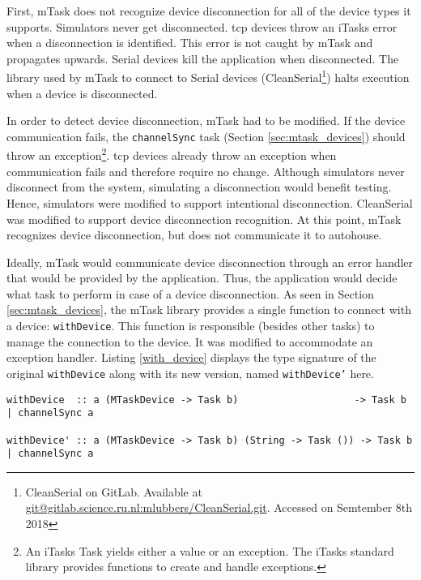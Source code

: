 First, \gls{mTask} does not recognize device disconnection for all of the device types it supports. Simulators never get disconnected. \acs{tcp} devices throw an \gls{iTasks} error when a disconnection is identified. This error is not caught by mTask and propagates upwards. Serial devices kill the application when disconnected. The library used by \gls{mTask} to connect to Serial devices (CleanSerial\footnote{CleanSerial on GitLab. Available at \url{git@gitlab.science.ru.nl:mlubbers/CleanSerial.git}. Accessed on Semtember 8th 2018}) halts execution when a device is disconnected. 

In order to detect device disconnection, \gls{mTask} had to be modified. If the device communication fails, the \texttt{channelSync} task (Section \ref{sec:mtask_devices}) should throw an exception\footnote{An \gls{iTasks} Task yields either a value or an exception. The \gls{iTasks} standard library provides functions to create and handle exceptions.}. \acs{tcp} devices already throw an exception when communication fails and therefore require no change. Although simulators never disconnect from the system, simulating a disconnection would benefit testing. Hence, simulators were modified to support intentional disconnection. CleanSerial was modified to support device disconnection recognition. At this point, \gls{mTask} recognizes device disconnection, but does not communicate it to \gls{autohouse}. 

Ideally, \gls{mTask} would communicate device disconnection through an error handler that would be provided by the application. Thus, the application would decide what task to perform in case of a device disconnection. As seen in Section \ref{sec:mtask_devices}, the \gls{mTask} library provides a single function to connect with a device: \texttt{withDevice}. This function is responsible (besides other tasks) to manage the connection to the device. It was modified to accommodate an exception handler. Listing \ref{with_device} displays the type signature of the original \texttt{withDevice} along with its new version, named \texttt{withDevice'} here.

\begin{lstlisting}[caption=Change in mTask to allow device disconnection handler,captionpos=b,label=with_device]
withDevice  :: a (MTaskDevice -> Task b)                    -> Task b | channelSync a

withDevice' :: a (MTaskDevice -> Task b) (String -> Task ()) -> Task b | channelSync a
\end{lstlisting}

